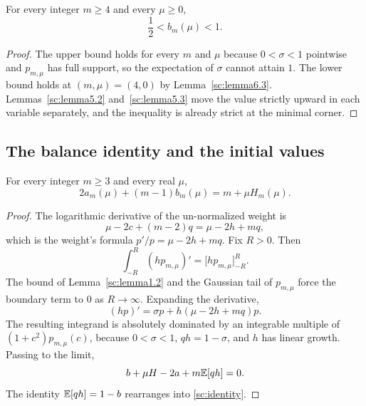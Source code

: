 \begin{corollary}\label{sc:corollary6.4}
For every integer \(m\ge 4\) and every \(\mu\ge 0\),
\[
\frac12<b_m(\mu)<1.
\]

\end{corollary}
\begin{proof}
The upper bound holds for every \(m\) and \(\mu\) because \(0<\sigma<1\) pointwise and \(p_{m,\mu}\) has full support, so the expectation of \(\sigma\) cannot attain \(1\). The lower bound holds at \((m,\mu)=(4,0)\) by Lemma~\ref{sc:lemma6.3}. Lemmas~\ref{sc:lemma5.2} and~\ref{sc:lemma5.3} move the value strictly upward in each variable separately, and the inequality is already strict at the minimal corner.

\end{proof}

\subsection{The balance identity and the initial values}\label{sc:sub7}

\begin{lemma}\label{sc:lemma7.1}
For every integer \(m\ge 3\) and every real \(\mu\),
\begin{equation}
\label{sc:identity}
2a_m(\mu)+(m-1)b_m(\mu)=m+\mu H_m(\mu).
\end{equation}

\end{lemma}
\begin{proof}
The logarithmic derivative of the un-normalized weight is
\[
\mu-2c+(m-2)q=\mu-2h+mq,
\]
which is the weight's formula \(p'/p=\mu-2h+mq\). Fix \(R>0\). Then
\[
\int_{-R}^{R}(hp_{m,\mu})'=\bigl[hp_{m,\mu}\bigr]_{-R}^{R}.
\]
The bound of Lemma~\ref{sc:lemma1.2} and the Gaussian tail of \(p_{m,\mu}\) force the boundary term to \(0\) as \(R\to\infty\). Expanding the derivative,
\[
(hp)'=\sigma p+h(\mu-2h+mq)p.
\]
The resulting integrand is absolutely dominated by an integrable multiple of \((1+c^2)p_{m,\mu}(c)\), because \(0<\sigma<1\), \(qh=1-\sigma\), and \(h\) has linear growth. Passing to the limit,
\[
b+\mu H-2a+m\mathbb E[qh]=0.
\]
The identity \(\mathbb E[qh]=1-b\) rearranges into \eqref{sc:identity}.

\end{proof}

